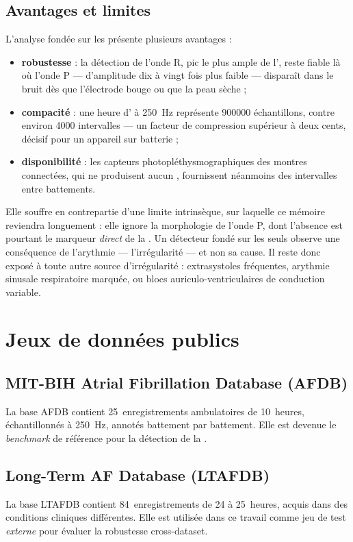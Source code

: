 \subsection{Avantages et limites}
L'analyse fondée sur les \RR{} présente plusieurs avantages :
\begin{itemize}
  \item \textbf{robustesse} : la détection de l'onde R, pic le plus ample de l'\ECG{}, reste fiable là où l'onde P — d'amplitude dix à vingt fois plus faible — disparaît dans le bruit dès que l'électrode bouge ou que la peau sèche ;
  \item \textbf{compacité} : une heure d'\ECG{} à \SI{250}{\hertz} représente \num{900000} échantillons, contre environ \num{4000} intervalles \RR{} — un facteur de compression supérieur à deux cents, décisif pour un appareil sur batterie ;
  \item \textbf{disponibilité} : les capteurs photopléthysmographiques des montres connectées, qui ne produisent aucun \ECG{}, fournissent néanmoins des intervalles entre battements.
\end{itemize}

Elle souffre en contrepartie d'une limite intrinsèque, sur laquelle ce mémoire reviendra longuement : elle ignore la morphologie de l'onde P, dont l'absence est pourtant le marqueur \emph{direct} de la \FA{}. Un détecteur fondé sur les seuls \RR{} observe une conséquence de l'arythmie — l'irrégularité — et non sa cause. Il reste donc exposé à toute autre source d'irrégularité : extrasystoles fréquentes, arythmie sinusale respiratoire marquée, ou blocs auriculo-ventriculaires de conduction variable.

\section{Jeux de données publics}
\label{sec:soa:datasets}

\subsection{MIT-BIH Atrial Fibrillation Database (AFDB)}
La base AFDB \cite{moody1983new} contient 25~enregistrements \ECG{} ambulatoires de 10~heures, échantillonnés à 250~Hz, annotés battement par battement. Elle est devenue le \textit{benchmark} de référence pour la détection de la \FA{}.

\subsection{Long-Term AF Database (LTAFDB)}
La base LTAFDB \cite{petrutiu2007abrupt} contient 84~enregistrements de 24 à 25~heures, acquis dans des conditions cliniques différentes. Elle est utilisée dans ce travail comme jeu de test \emph{externe} pour évaluer la robustesse cross-dataset.

